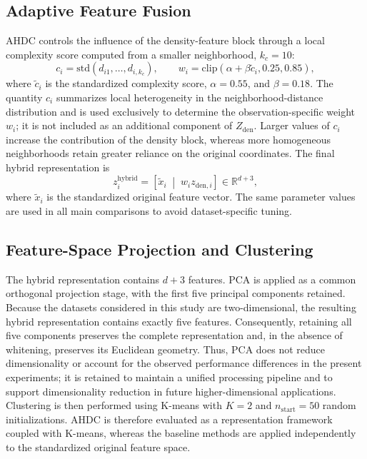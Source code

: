 \documentclass[twoside]{article}
\begin{document}
\subsection{Adaptive Feature Fusion}
AHDC controls the influence of the density-feature block through a local complexity score computed from a smaller neighborhood, $k_c=10$:
\begin{equation}
	c_i=\mathrm{std}(d_{i1},\ldots,d_{i,k_c}),\qquad
	w_i=\mathrm{clip}(\alpha+\beta\tilde{c}_i,0.25,0.85),
	\label{eq:weight}
\end{equation}
where $\tilde{c}_i$ is the standardized complexity score, $\alpha=0.55$, and $\beta=0.18$. The quantity $c_i$ summarizes local heterogeneity in the neighborhood-distance distribution and is used exclusively to determine the observation-specific weight $w_i$; it is not included as an additional component of $Z_{\mathrm{den}}$. Larger values of $c_i$ increase the contribution of the density block, whereas more homogeneous neighborhoods retain greater reliance on the original coordinates. The final hybrid representation is
\begin{equation}
	z_i^{\mathrm{hybrid}}=\left[\tilde{x}_i\;\middle|\;w_i z_{\mathrm{den},i}\right]\in\mathbb{R}^{d+3},
	\label{eq:hybrid}
\end{equation}
where $\tilde{x}_i$ is the standardized original feature vector. The same parameter values are used in all main comparisons to avoid dataset-specific tuning.
\subsection{Feature-Space Projection and Clustering}

The hybrid representation contains $d+3$ features. PCA is applied as a
common orthogonal projection stage, with the first five principal components
retained. Because the datasets considered in this study are two-dimensional,
the resulting hybrid representation contains exactly five features.
Consequently, retaining all five components preserves the complete
representation and, in the absence of whitening, preserves its Euclidean
geometry. Thus, PCA does not reduce dimensionality or account for the
observed performance differences in the present experiments; it is retained
to maintain a unified processing pipeline and to support dimensionality
reduction in future higher-dimensional applications. Clustering is then
performed using K-means with $K=2$ and
$n_{\mathrm{start}}=50$ random initializations. AHDC is therefore evaluated
as a representation framework coupled with K-means, whereas the baseline
methods are applied independently to the standardized original feature space.
\end{document}
